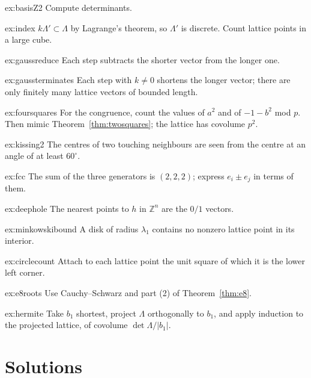 \begin{hint}{ex:basisZ2}
Compute determinants.
\end{hint}
\begin{hint}{ex:index}
$k\Lambda'\subset\Lambda$ by Lagrange's theorem, so $\Lambda'$ is discrete. Count lattice points in a large cube.
\end{hint}
\begin{hint}{ex:gaussreduce}
Each step subtracts the shorter vector from the longer one.
\end{hint}
\begin{hint}{ex:gaussterminates}
Each step with $k\ne0$ shortens the longer vector; there are only finitely many lattice vectors of bounded length.
\end{hint}
\begin{hint}{ex:foursquares}
For the congruence, count the values of $a^2$ and of $-1-b^2$ mod $p$. Then mimic Theorem~\ref{thm:twosquares}; the lattice has covolume $p^2$.
\end{hint}
\begin{hint}{ex:kissing2}
The centres of two touching neighbours are seen from the centre at an angle of at least $60^\circ$.
\end{hint}
\begin{hint}{ex:fcc}
The sum of the three generators is $(2,2,2)$; express $e_i\pm e_j$ in terms of them.
\end{hint}
\begin{hint}{ex:deephole}
The nearest points to $h$ in $\mathbb Z^n$ are the $0/1$ vectors.
\end{hint}
\begin{hint}{ex:minkowskibound}
A disk of radius $\lambda_1$ contains no nonzero lattice point in its interior.
\end{hint}
\begin{hint}{ex:circlecount}
Attach to each lattice point the unit square of which it is the lower left corner.
\end{hint}
\begin{hint}{ex:e8roots}
Use Cauchy--Schwarz and part (2) of Theorem~\ref{thm:e8}.
\end{hint}
\begin{hint}{ex:hermite}
Take $b_1$ shortest, project $\Lambda$ orthogonally to $b_1$, and apply induction to the projected lattice, of covolume $\det\Lambda/|b_1|$.
\end{hint}

\section{Solutions}

